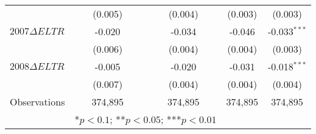 \begin{table}[H]
\begin{tabular}{@{}lcccc@{}}
                        & (0.005)           & (0.004)           & (0.003)         & (0.003) \\
 $2007\Delta ELTR$      & -0.020\sym{***}   & -0.034\sym{***}   & -0.046\sym{***}  & -0.033$^{***}$ \\
                        & (0.006)           & (0.004)          & (0.004)         & (0.003)   \\
 $2008\Delta ELTR$      & -0.005            & -0.020\sym{***}   & -0.031\sym{***}  & -0.018$^{***}$ \\
                        & (0.007)           & (0.004)          & (0.004)         & (0.004) \\ 
                        \midrule
  Observations & 374,895 & 374,895 & 374,895 & 374,895 \\ 
                        \midrule
                & \multicolumn{2}{l}{*$p<0.1$; **$p<0.05$; ***$p<0.01$}
  \end{tabular}
  \end{table}